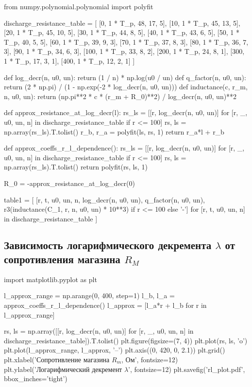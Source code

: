 \documentclass[12pt, a4paper]{article}
\begin{document}
\begin{pycode}
from numpy.polynomial.polynomial import polyfit

discharge_resistance_table = [
  [0, 1 * T_p, 48, 17, 5],
  [10, 1 * T_p, 45, 13, 5],
  [20, 1 * T_p, 45, 10, 5],
  [30, 1 * T_p, 44, 8, 5],
  [40, 1 * T_p, 43, 6, 5],
  [50, 1 * T_p, 40, 5, 5],
  [60, 1 * T_p, 39, 9, 3],
  [70, 1 * T_p, 37, 8, 3],
  [80, 1 * T_p, 36, 7, 3],
  [90, 1 * T_p, 34, 6, 3],
  [100, 1 * T_p, 33, 8, 2],
  [200, 1 * T_p, 24, 8, 1],
  [300, 1 * T_p, 17, 3, 1],
  [400, 1 * T_p, 12, 2, 1]
]

def log_decr(n, u0, un):
  return (1 / n) * np.log(u0 / un)
def q_factor(n, u0, un):
  return (2 * np.pi) / (1 - np.exp(-2 * log_decr(n, u0, un)))
def inductance(c, r_m, n, u0, un):
  return (np.pi**2 * c * (r_m + R_0)**2) / log_decr(n, u0, un)**2

def approx_resistance_at_log_decr(l):
  rs_ls = [[r, log_decr(n, u0, un)] for [r, _, u0, un, n] in discharge_resistance_table if r <= 100]
  rs, ls = np.array(rs_ls).T.tolist()
  r_b, r_a = polyfit(ls, rs, 1)
  return r_a*l + r_b

def approx_coeffs_r_l_dependence():
  rs_ls = [[r, log_decr(n, u0, un)] for [r, _, u0, un, n] in discharge_resistance_table if r <= 100]
  rs, ls = np.array(rs_ls).T.tolist()
  return polyfit(rs, ls, 1)

R_0 = -approx_resistance_at_log_decr(0)

table1 = [
  [r, t, u0, un, n, log_decr(n, u0, un), q_factor(n, u0, un), r3(inductance(C_1, r, n, u0, un) * 10**3) if r <= 100 else '-']
  for [r, t, u0, un, n] in discharge_resistance_table
]
\end{pycode}


\subsection*{Зависимость логарифмического декремента $\lambda$ от сопротивления магазина $R_M$}

\begin{pycode}
import matplotlib.pyplot as plt

l_approx_range = np.arange(0, 400, step=1)
l_b, l_a = approx_coeffs_r_l_dependence()
l_approx = [l_a*r + l_b for r in l_approx_range]

rs, ls = np.array([[r, log_decr(n, u0, un)] for [r, _, u0, un, n] in discharge_resistance_table]).T.tolist()
plt.figure(figsize=(7, 4))
plt.plot(rs, ls, 'o')
plt.plot(l_approx_range, l_approx, '--')
plt.axis((0, 420, 0, 2.1))
plt.grid()
plt.xlabel('Сопротивление магазина $R_m$, Ом', fontsize=12)
plt.ylabel('Логарифмический декремент $\lambda$', fontsize=12)
plt.savefig('rl_plot.pdf', bbox_inches='tight')
\end{pycode}
\end{document}
